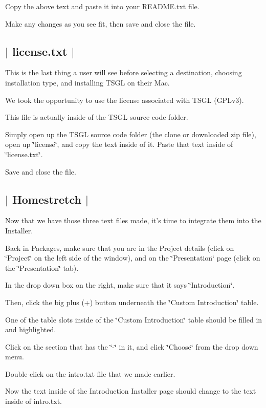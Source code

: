 Copy the above text and paste it into your R\-E\-A\-D\-M\-E.\-txt file.

Make any changes as you see fit, then save and close the file. 

 \subsection*{$\vert$ license.\-txt $\vert$ }

This is the last thing a user will see before selecting a destination, choosing installation type, and installing T\-S\-G\-L on their Mac.

We took the opportunity to use the license associated with T\-S\-G\-L (G\-P\-Lv3).

This file is actually inside of the T\-S\-G\-L source code folder.

Simply open up the T\-S\-G\-L source code folder (the clone or downloaded zip file), open up \char`\"{}license\char`\"{}, and copy the text inside of it. Paste that text inside of \char`\"{}license.\-txt\char`\"{}.

Save and close the file. 

 \subsection*{$\vert$ Homestretch $\vert$ }

Now that we have those three text files made, it's time to integrate them into the Installer.

Back in Packages, make sure that you are in the Project details (click on \char`\"{}\-Project\char`\"{} on the left side of the window), and on the \char`\"{}\-Presentation\char`\"{} page (click on the \char`\"{}\-Presentation\char`\"{} tab).

In the drop down box on the right, make sure that it says \char`\"{}\-Introduction\char`\"{}.

Then, click the big plus (+) button underneath the \char`\"{}\-Custom Introduction\char`\"{} table.

One of the table slots inside of the \char`\"{}\-Custom Introduction\char`\"{} table should be filled in and highlighted.

Click on the section that has the \char`\"{}-\/\char`\"{} in it, and click \char`\"{}\-Choose\char`\"{} from the drop down menu.

Double-\/click on the intro.\-txt file that we made earlier.

Now the text inside of the Introduction Installer page should change to the text inside of intro.\-txt.



